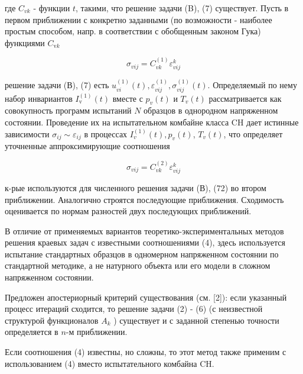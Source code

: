 \documentclass[10pt]{article}
\begin{document}
где $C_{v k}$ - функции $t$, такими, что решение задачи (B), (7) существует. Пусть в первом приближении с конкретно заданными (по возможности - наиболее простым способом, напр. в соответствии с обобщенным законом Гука) функциями $C_{\mathrm{v} k}$



\[

\sigma_{v i j}=C_{v k}^{(1)} \varepsilon_{v i j}^{k}

\]



решение задачи (В), (7) есть $u_{v i}^{(1)}(t), \varepsilon_{v i j}^{(1)}, \sigma_{v i j}^{(1)}(t)$. Определяемый по нему набор инвариантов $I_{\mathrm{v}}^{(1)}(t)$ вместе с $p_{v}(t)$ и $T_{v}(t)$ рассматривается как совокупность программ испытаний $N$ образцов в однородном напряженном состоянии. Проведение их на испытательном комбайне класса $\mathrm{CH}$ дает истинные зависимости $\sigma_{i j} \sim \varepsilon_{i j}$ в процессах $I_{v}^{(1)}(t), p_{v}(t)$, $T_{v}(t)$, что определяет уточненные аппроксимирующие соотношения



\[

\sigma_{v i j}=C_{v k}^{(2)} \varepsilon_{v i j}^{k}

\]



к-рые используются для численного решения задачи (В), (72) во втором приближении. Аналогично строятся последующие приближения. Сходимость оценивается по нормам разностей двух последующих приближений.



В отличие от применяемых вариантов теоретико-экспериментальных методов решения краевых задач с известными соотношениями (4), здесь используется испытание стандартных образцов в одномерном напряженном состоянии по стандартной методике, а не натурного объекта или его модели в сложном напряженном состоянии.



Предложен апостериорный критерий существования (см. [2]): если указанный процесс итераций сходится, то решение задачи (2) - (6) (с неизвестной структурой функционалов $A_{k}$ ) существует и с заданной степенью точности определяется в $n$-м приближении.



Если соотношения (4) известны, но сложны, то этот метод также применим с использованием (4) вместо испытательного комбайна $\mathrm{CH}$.
\end{document}
